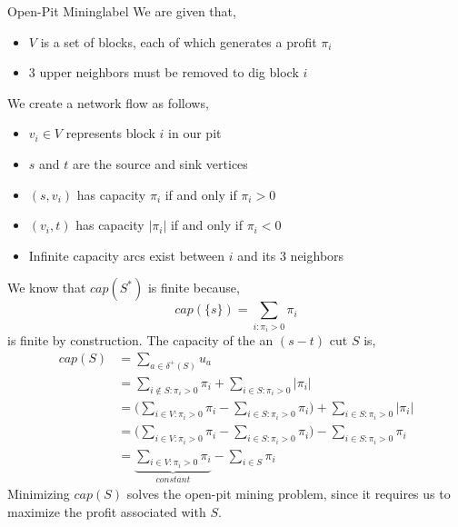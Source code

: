 	\begin{ex}{Open-Pit Mining}{label}
		We are given that,
		\begin{itemize}
			\item $V$ is a set of blocks, each of which generates a profit $\pi_i$
			\item 3 upper neighbors must be removed to dig block $i$
		\end{itemize}
		\noindent We create a network flow as follows,
		\begin{itemize}
			\item $v_i \in V$ represents block $i$ in our pit
			\item $s$ and $t$ are the source and sink vertices
			\item $(s,v_i)$ has capacity $\pi_i$ if and only if $\pi_i > 0$
			\item $(v_i, t)$ has capacity $|\pi_i|$ if and only if $\pi_i < 0$
			\item Infinite capacity arcs exist between $i$ and its 3 neighbors
		\end{itemize}

		We know that $cap(S^*)$ is finite because,
		\[cap(\{s\})= \sum_{i:\pi_i > 0} \pi_i\]
		is finite by construction. The capacity of the an $(s-t)$ cut $S$ is,
		\begin{align*}
			cap(S) &= \sum_{a \in \delta^+(S)}  u_a \\
			       &= \sum_{i \not\in S: \pi_i > 0} \pi_i + \sum_{i \in S: \pi_i > 0} |\pi_i| \\
			       &= \bigg(\sum_{i \in V: \pi_i > 0} \pi_i - \sum_{i \in S: \pi_i > 0} \pi_i \bigg) + \sum_{i \in S: \pi_i > 0} |\pi_i| \\
			       &= \bigg(\sum_{i \in V: \pi_i > 0} \pi_i - \sum_{i \in S: \pi_i > 0} \pi_i \bigg) - \sum_{i \in S: \pi_i > 0} \pi_i \\
			       &= \underbrace{\sum_{i \in V: \pi_i > 0} \pi_i}_{constant} - \sum_{i \in S} \pi_i
		\end{align*}
		Minimizing $cap(S)$ solves the open-pit mining problem, since it requires us to maximize the profit associated with $S$.
	\label{mining}
	\end{ex}

